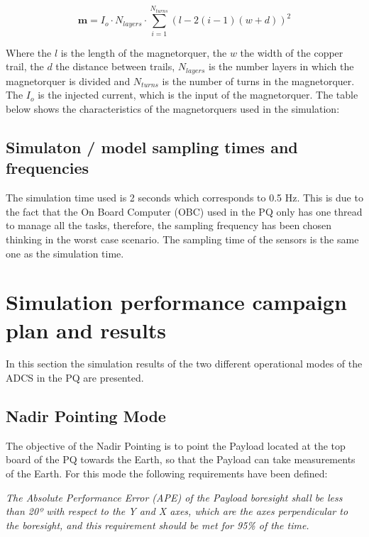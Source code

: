 \begin{equation}
    \boldsymbol{m}=I_o·N_{layers}·\sum_{i=1}^{N_{turns}}(l-2(i-1)(w+d))^2
\end{equation}

\noindent Where the $l$ is the length of the magnetorquer, the $w$ the width of the copper trail, the $d$ the distance between trails, $N_{layers}$ is the number
layers in which the magnetorquer is divided and $N_{turns}$ is the number of turns in the magnetorquer. The $I_o$ is the injected current, which is the input of the magnetorquer. 
The table below shows the characteristics of the magnetorquers used in the simulation:

\magnetorquercharacteristics



\subsection{Simulaton / model sampling times and frequencies}
The simulation time used is 2 seconds which corresponds to 0.5 Hz. This is due to the fact that the On Board Computer (OBC) used in the PQ
only has one thread to manage all the tasks, therefore, the sampling frequency has been chosen thinking in the worst case scenario. The 
sampling time of the sensors is the same one as the simulation time.

\section{Simulation performance campaign plan and results}

In this section the simulation results of the two different operational modes of the ADCS in the PQ are presented.

\subsection{Nadir Pointing Mode}

The objective of the Nadir Pointing is to point the Payload located at the top board of the PQ towards the Earth, so that 
the Payload can take measurements of the Earth. For this mode the following requirements have been defined: \vspace{1em}


\noindent \textit{The Absolute Performance Error (APE) of the Payload boresight shall be less than 20º with respect to the Y and X 
axes, which are the axes perpendicular to the boresight, and this requirement should be met for 95\% of the time.} \vspace{1em}


